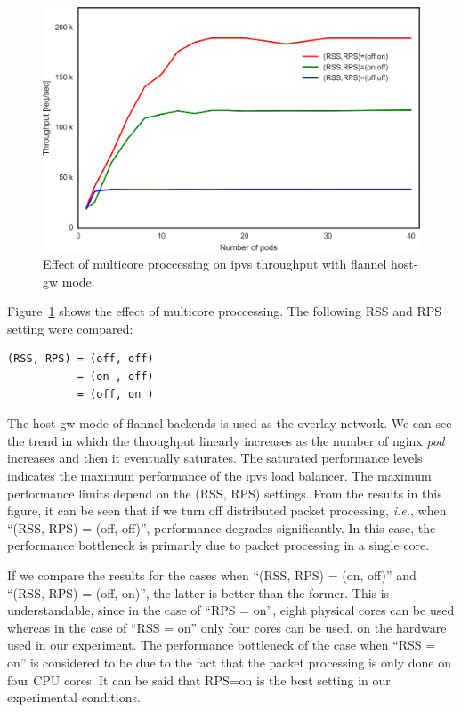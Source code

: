 \begin{figure}
  \centering
  \includegraphics[width=0.8\columnwidth]{Figs/ipvs_mcore_proccessing}
  \caption{Effect of multicore proccessing on ipvs throughput with flannel host-gw mode.}
  \label{fig:ipvs_mcore_proccessing}
\end{figure}

Figure~\ref{fig:ipvs_mcore_proccessing} shows the effect of multicore proccessing.
The following RSS and RPS setting were compared: 

\begin{center}
  \centering
  \begin{minipage}{0.8\columnwidth}
\begin{verbatim}
(RSS, RPS) = (off, off)
           = (on , off)
           = (off, on )
\end{verbatim}
  \end{minipage}
\end{center}

The host-gw mode of flannel backends is used as the overlay network.
We can see the trend in which the throughput linearly increases as the number of nginx {\em pod} increases and then it eventually saturates.
The saturated performance levels indicates the maximum performance of the ipvs load balancer.
The maximum performance limits depend on the (RSS, RPS) settings.
From the results in this figure, it can be seen that if we turn off distributed packet processing,
{\it i.e.}, when \enquote{(RSS, RPS) = (off, off)}, performance degrades significantly.
In this case, the performance bottleneck is primarily due to packet processing in a single core.

If we compare the results for the cases when \enquote{(RSS, RPS) = (on, off)} and \enquote{(RSS, RPS) = (off, on)},
the latter is better than the former.
This is understandable, since in the case of \enquote{RPS = on}, eight physical cores can be used whereas 
in the case of \enquote{RSS = on} only four cores can be used, on the hardware used in our experiment.
The performance bottleneck of the case when \enquote{RSS = on} is considered 
to be due to the fact that the packet processing is only done on four CPU cores.
It can be said that RPS=on is the best setting in our experimental conditions.

